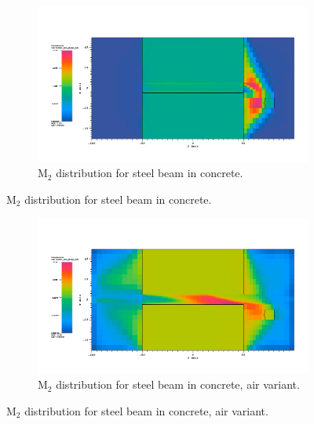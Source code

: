 \begin{figure}[htb!]
  \centering
  \begin{subfigure}[t]{\textwidth}
    \includegraphics[width=0.9\linewidth]{./chapters/characterization_probs/figures/char/prob_1/prob1M2G26.png}
    \caption{M$_2$ distribution for steel beam in concrete.}
    \label{fig:M2steel}
  \end{subfigure}
\end{figure}
\begin{figure}[htb!]\ContinuedFloat
  \centering
  \begin{subfigure}[t]{\textwidth}
    \includegraphics[width=0.9\linewidth]{./chapters/characterization_probs/figures/char/prob1v1/prob1v1M2G026log.png}
    \caption{M$_2$ distribution for steel beam in concrete, air variant.}
    \label{fig:M2air}
  \end{subfigure}
\end{figure}
